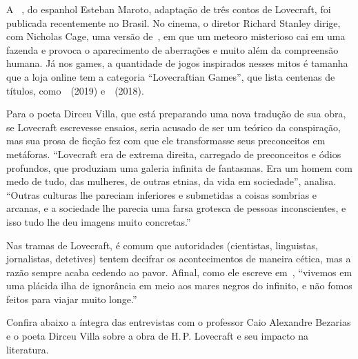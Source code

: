 \begin{changemargin}
A  {}, do espanhol Esteban Maroto, adaptação de três contos de Lovecraft, foi publicada recentemente no Brasil. No cinema, o diretor Richard Stanley dirige, com Nicholas Cage, uma versão de {}, em que um meteoro misterioso cai em uma fazenda e provoca o aparecimento de aberrações e muito além da compreensão humana. Já nos games, a quantidade de jogos inspirados nesses mitos é tamanha que a loja online {} tem a categoria “Lovecraftian Games”, que lista centenas de títulos, como {} (2019) e {} (2018). 

Para o poeta Dirceu Villa, que está preparando uma nova tradução de sua obra, se Lovecraft escrevesse ensaios, seria acusado de ser um teórico da conspiração, mas sua prosa de ficção fez com que ele transformasse seus preconceitos em metáforas. “Lovecraft era de extrema direita, carregado de preconceitos e ódios profundos, que produziam uma galeria infinita de fantasmas. Era um homem com medo de tudo, das mulheres, de outras etnias, da vida em sociedade”, analisa. “Outras culturas lhe pareciam inferiores e submetidas a coisas sombrias e arcanas, e a sociedade lhe parecia uma farsa grotesca de pessoas inconscientes, e isso tudo lhe deu imagens muito concretas.”

Nas tramas de Lovecraft, é comum que autoridades (cientistas, linguistas, jornalistas, detetives) tentem decifrar os acontecimentos de maneira cética, mas a razão sempre acaba cedendo ao pavor. Afinal, como ele escreve em {}, “vivemos em uma plácida ilha de ignorância em meio aos mares negros do infinito, e não fomos feitos para viajar muito longe.”

Confira abaixo a íntegra das entrevistas com o professor Caio Alexandre Bezarias e o poeta Dirceu Villa sobre a obra de H.\,P. Lovecraft e seu impacto na literatura.

\bigskip
\bigskip


\bigskip



\end{changemargin}
